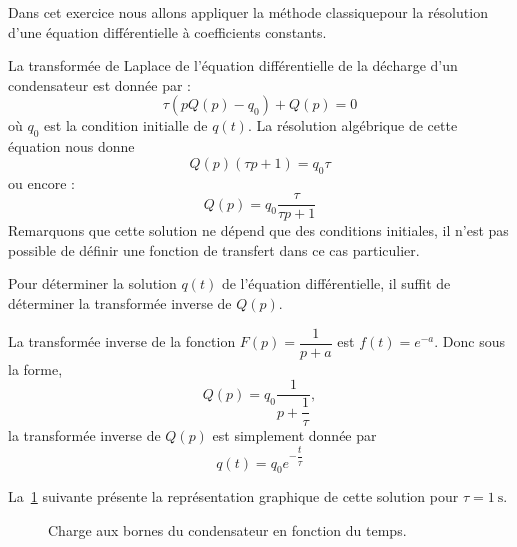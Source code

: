 Dans cet exercice nous allons appliquer la méthode \fg classique\og pour la
résolution d'une équation différentielle à coefficients constants.

La transformée de Laplace de l'équation différentielle de la décharge d'un
condensateur est donnée par :
\[
    \tau(pQ(p)-q_0)+Q(p)=0
\]
où $q_0$ est la condition initialle de $q(t)$.
La résolution algébrique de cette équation nous donne 
\[
    Q(p)(\tau p+1)=q_0\tau
\]
ou encore :
\[
    Q(p)=q_0\dfrac{\tau}{\tau p+1}
\]
Remarquons que cette solution ne dépend que des conditions initiales, il n'est 
pas possible de définir une fonction de transfert dans ce cas particulier.

Pour déterminer la solution $q(t)$ de l'équation différentielle, il suffit de 
déterminer la transformée inverse de $Q(p)$.

La transformée inverse de la fonction $F(p)=\dfrac{1}{p+a}$ est $f(t)=e^{-a}$.
Donc sous la forme,
\[
    Q(p)=q_0\dfrac{1}{p+\dfrac{1}{\tau}},
\]
la transformée inverse de $Q(p)$ est simplement donnée par 
\[
    q(t)=q_0e^{-\dfrac{t}{\tau}}
\]
\begin{center}
    
\end{center}
La~\cref{fig-decharge} suivante présente la représentation graphique de 
cette solution pour $\tau=\SI{1}{\second}$.
\begin{figure}[!h]
    \centering
    
    \caption{Charge aux bornes du condensateur en fonction du temps.
    \label{fig-decharge}}
\end{figure}

